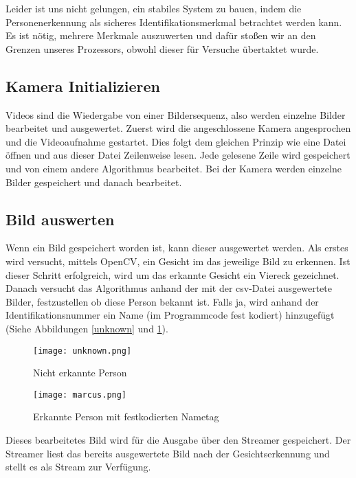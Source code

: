 Leider ist uns nicht gelungen, ein stabiles System zu bauen, indem die Personenerkennung als sicheres Identifikationsmerkmal betrachtet werden kann. Es ist nötig, mehrere Merkmale auszuwerten und dafür stoßen wir an den Grenzen unseres Prozessors, obwohl dieser für Versuche übertaktet wurde.


\subsection{Kamera Initializieren}
Videos sind die Wiedergabe von einer Bildersequenz, also werden einzelne Bilder bearbeitet und ausgewertet.  Zuerst wird die angeschlossene Kamera angesprochen und die Videoaufnahme gestartet. Dies folgt dem gleichen Prinzip wie eine Datei öffnen und aus dieser Datei Zeilenweise lesen. Jede gelesene Zeile wird gespeichert und von einem andere Algorithmus bearbeitet. Bei der Kamera werden einzelne Bilder gespeichert und danach bearbeitet.\\
 
\subsection{Bild auswerten}
 Wenn ein Bild gespeichert worden ist, kann dieser ausgewertet werden. Als erstes wird versucht, mittels OpenCV, ein Gesicht im das jeweilige Bild zu erkennen. Ist dieser Schritt erfolgreich, wird um das erkannte Gesicht ein Viereck gezeichnet. Danach versucht das Algorithmus anhand der mit der csv-Datei ausgewertete Bilder, festzustellen ob diese Person bekannt ist. Falls ja, wird anhand der Identifikationsnummer ein Name (im Programmcode fest kodiert) hinzugefügt (Siehe Abbildungen \ref{unknown} und \ref{marcus}). \\


\begin{figure}[h]
\begin{minipage}[h]{5cm}
	\centering
	\texttt{[image: unknown.png]}
	\caption{Nicht erkannte Person}
	\label{unknown}
\end{minipage}
\hfill
\begin{minipage}[h]{5cm}
	\centering
	\texttt{[image: marcus.png]}
	\caption{Erkannte Person mit festkodierten Nametag}
	\label{marcus}
\end{minipage}
\end{figure}

Dieses bearbeitetes Bild wird für die Ausgabe über den Streamer gespeichert. Der Streamer liest das bereits ausgewertete Bild nach der Gesichtserkennung und stellt es als Stream zur Verfügung.
 
